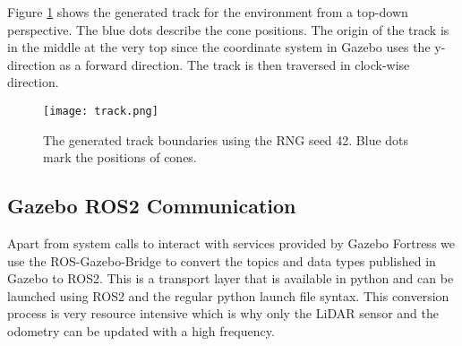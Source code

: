 Figure \ref{fig:track} shows the generated track for the environment from a top-down perspective. The blue dots describe the cone positions. The origin of the track is in the middle at the very top since the coordinate system in Gazebo uses the y-direction as a forward direction. The track is then traversed in clock-wise direction.

\begin{figure}[ht]
\vskip 0.2in
\begin{center}
\centerline{\texttt{[image: track.png]}}
\caption{The generated track boundaries using the RNG seed 42. Blue dots mark the positions of cones.}
\label{fig:track}
\end{center}
\vskip -0.2in
\end{figure}

\subsection{Gazebo ROS2 Communication}

Apart from system calls to interact with services provided by Gazebo Fortress we use the ROS-Gazebo-Bridge to convert the topics and data types published in Gazebo to ROS2. 
This is a transport layer that is available in python and can be launched using ROS2 and the regular python launch file syntax. 
This conversion process is very resource intensive which is why only the LiDAR sensor and the odometry can be updated with a high frequency.

